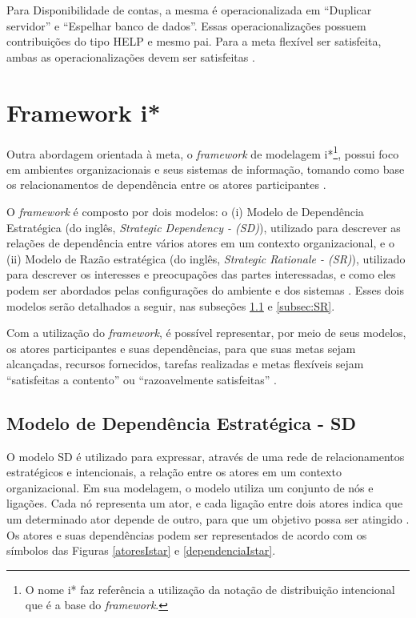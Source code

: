 Para Disponibilidade de contas, a mesma é operacionalizada em “Duplicar servidor” e “Espelhar banco de dados”. Essas operacionalizações possuem contribuições do tipo HELP e mesmo pai. Para a meta flexível ser satisfeita, ambas as operacionalizações devem ser satisfeitas \cite{affleck2012supporting}. 


\section{Framework i*}
\label{sec:i*}


Outra abordagem orientada à meta, o \textit{framework} de modelagem i*\footnote[1]{O nome i* faz referência a utilização da notação de distribuição intencional que é a base do \textit{framework}.}, possui foco em ambientes organizacionais e seus sistemas de informação, tomando como base os relacionamentos de dependência entre os atores participantes \cite{yu1997towards} \cite{istarwiki20}. 

O \textit{framework} é composto por dois modelos: o (i) Modelo de Dependência Estratégica (do inglês, \textit{Strategic Dependency - (SD)}), utilizado para descrever as relações de dependência entre vários atores em um contexto organizacional, e o (ii) Modelo de Razão estratégica (do inglês, \textit{Strategic Rationale - (SR)}), utilizado para descrever os interesses e preocupações das partes interessadas, e como eles podem ser abordados pelas configurações do ambiente e dos sistemas \cite{yu1997towards}. Esses dois modelos serão detalhados a seguir, nas subseções \ref{subsec:SD} e \ref{subsec:SR}.

Com a utilização do \textit{framework}, é possível representar, por meio de seus modelos, os atores participantes e suas dependências, para que suas metas sejam alcançadas, recursos fornecidos, tarefas realizadas e metas flexíveis sejam “satisfeitas a contento” ou “razoavelmente satisfeitas” \cite{istarwiki20}.
 
 
\subsection{Modelo de Dependência Estratégica - SD}
\label{subsec:SD}

O modelo SD é utilizado para expressar, através de uma rede de relacionamentos estratégicos e intencionais, a relação entre os atores em um contexto organizacional. Em sua modelagem, o modelo utiliza um conjunto de nós e ligações. Cada nó representa um ator, e cada ligação entre dois atores indica que um determinado ator depende de outro, para que um objetivo possa ser atingido \cite{istarwiki20}. Os atores e suas dependências podem ser representados de acordo com os símbolos das Figuras  \ref{atoresIstar} e \ref{dependenciaIstar}.

